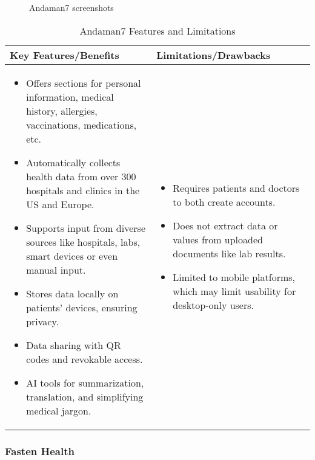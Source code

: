 \begin{figure}[ht]
    \centering
     \quad
    \caption{Andaman7 screenshots}
    \label{fig:andaman7}
\end{figure}

\begin{table}[htbp]
\centering
    \begin{tabular}{|p{}|p{}|}
    \hline
    \textbf{Key Features/Benefits} & \textbf{Limitations/Drawbacks} \\ \hline
    \begin{itemize}
        \item Offers sections for personal information, medical history, allergies, vaccinations, medications, etc.
        \item Automatically collects health data from over 300 hospitals and clinics in the US and Europe.
        \item Supports input from diverse sources like hospitals, labs, smart devices or even manual input.
        \item Stores data locally on patients’ devices, ensuring privacy.
        \item Data sharing with QR codes and revokable access.
        \item AI tools for summarization, translation, and simplifying medical jargon.
    \end{itemize} &
    \begin{itemize}
        \item Requires patients and doctors to both create accounts.
        \item Does not extract data or values from uploaded documents like lab results.
        \item Limited to mobile platforms, which may limit usability for desktop-only users.
    \end{itemize} \\ \hline
    \end{tabular}
\caption{Andaman7 Features and Limitations}
\label{tab:andaman7}
\end{table}

\FloatBarrier

\subsubsection{Fasten Health}

